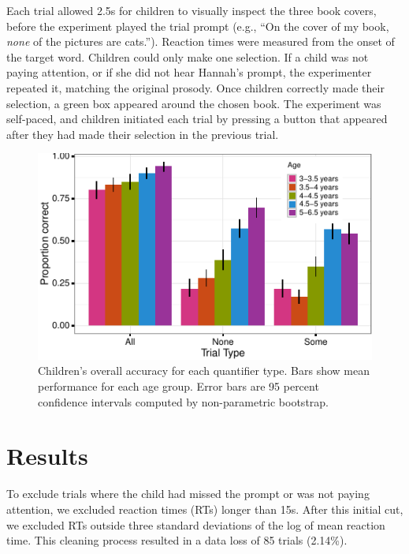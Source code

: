 \documentclass[10pt, letterpaper]{article}
\newenvironment{CodeChunk}{}{}
\begin{document}
Each trial allowed 2.5s for children to visually inspect the three book
covers, before the experiment played the trial prompt (e.g., ``On the
cover of my book, \emph{none} of the pictures are cats.''). Reaction
times were measured from the onset of the target word. Children could
only make one selection. If a child was not paying attention, or if she
did not hear Hannah's prompt, the experimenter repeated it, matching the
original prosody. Once children correctly made their selection, a green
box appeared around the chosen book. The experiment was self-paced, and
children initiated each trial by pressing a button that appeared after
they had made their selection in the previous trial.

\begin{CodeChunk}
\begin{figure}[t]
\includegraphics{figs/overall_acc-1} \caption[Children's overall accuracy for each quantifier type]{Children's overall accuracy for each quantifier type. Bars show mean performance for each age group. Error bars are 95 percent confidence intervals computed by non-parametric bootstrap.}\label{fig:overall_acc}
\end{figure}
\end{CodeChunk}

\section{Results}\label{results}

To exclude trials where the child had missed the prompt or was not
paying attention, we excluded reaction times (RTs) longer than 15s.
After this initial cut, we excluded RTs outside three standard
deviations of the log of mean reaction time. This cleaning process
resulted in a data loss of 85 trials (2.14\%).
\end{document}
